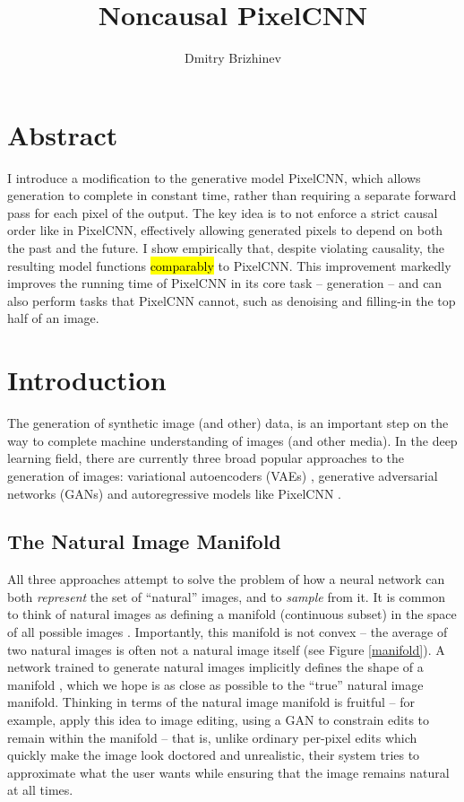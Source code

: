 \documentclass[10pt,a4paper]{article}
\newcommand{\nquote}[1]{``{#1}''}
\begin{document}
\title{\vspace{-10ex}Noncausal PixelCNN}
\author{Dmitry Brizhinev}
\maketitle

\section*{Abstract}
I introduce a modification to the generative model PixelCNN, which allows generation to complete in constant time, rather than requiring a separate forward pass for each pixel of the output. The key idea is to not enforce a strict causal order like in PixelCNN, effectively allowing generated pixels to depend on both the past and the future. I show empirically that, despite violating causality, the resulting model functions \hl{comparably} to PixelCNN. This improvement markedly improves the running time of PixelCNN in its core task -- generation -- and can also perform tasks that PixelCNN cannot, such as denoising and filling-in the top half of an image.

\tableofcontents

\section{Introduction}

The generation of synthetic image (and other) data, is an important step on the way to complete machine understanding of images (and other media). In the deep learning field, there are currently three broad popular approaches to the generation of images: variational autoencoders (VAEs) \citep{vae}, generative adversarial networks (GANs) \citep{gan} and autoregressive models like PixelCNN \citep{pixelcnn2}.

\subsection{The Natural Image Manifold}

All three approaches attempt to solve the problem of how a neural network can both \emph{represent} the set of \nquote{natural} images, and to \emph{sample} from it. It is common to think of natural images as defining a manifold (continuous subset) in the space of all possible images \citep{manifoldmanipulation,imageinpainting,manifoldmixup}. Importantly, this manifold is not convex -- the average of two natural images is often not a natural image itself (see Figure \ref{manifold}). A network trained to generate natural images implicitly defines the shape of a manifold \citep{manifoldmanipulation}, which we hope is as close as possible to the \nquote{true} natural image manifold. Thinking in terms of the natural image manifold is fruitful -- for example, \citet{manifoldmanipulation} apply this idea to image editing, using a GAN to constrain edits to remain within the manifold -- that is, unlike ordinary per-pixel edits which quickly make the image look doctored and unrealistic, their system tries to approximate what the user wants while ensuring that the image remains natural at all times.
\end{document}

